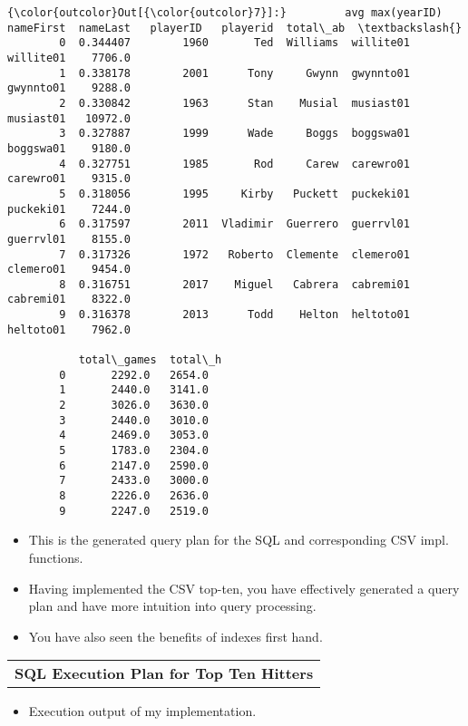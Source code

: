 \documentclass[11pt]{article}
\providecommand{\tightlist}{%
      \setlength{\itemsep}{0pt}\setlength{\parskip}{0pt}}
\begin{document}
\begin{Verbatim}[commandchars=\\\{\}]
{\color{outcolor}Out[{\color{outcolor}7}]:}         avg max(yearID) nameFirst  nameLast   playerID   playerid  total\_ab  \textbackslash{}
        0  0.344407        1960       Ted  Williams  willite01  willite01    7706.0   
        1  0.338178        2001      Tony     Gwynn  gwynnto01  gwynnto01    9288.0   
        2  0.330842        1963      Stan    Musial  musiast01  musiast01   10972.0   
        3  0.327887        1999      Wade     Boggs  boggswa01  boggswa01    9180.0   
        4  0.327751        1985       Rod     Carew  carewro01  carewro01    9315.0   
        5  0.318056        1995     Kirby   Puckett  puckeki01  puckeki01    7244.0   
        6  0.317597        2011  Vladimir  Guerrero  guerrvl01  guerrvl01    8155.0   
        7  0.317326        1972   Roberto  Clemente  clemero01  clemero01    9454.0   
        8  0.316751        2017    Miguel   Cabrera  cabremi01  cabremi01    8322.0   
        9  0.316378        2013      Todd    Helton  heltoto01  heltoto01    7962.0   
        
           total\_games  total\_h  
        0       2292.0   2654.0  
        1       2440.0   3141.0  
        2       3026.0   3630.0  
        3       2440.0   3010.0  
        4       2469.0   3053.0  
        5       1783.0   2304.0  
        6       2147.0   2590.0  
        7       2433.0   3000.0  
        8       2226.0   2636.0  
        9       2247.0   2519.0  
\end{Verbatim}
            
    \begin{itemize}
\item
  This is the generated query plan for the SQL and corresponding CSV
  impl. functions.
\item
  Having implemented the CSV top-ten, you have effectively generated a
  query plan and have more intuition into query processing.
\item
  You have also seen the benefits of indexes first hand.
\end{itemize}

\begin{longtable}[]{@{}c@{}}
\toprule
\tabularnewline
\midrule
\endhead
\textbf{SQL Execution Plan for Top Ten Hitters}\tabularnewline
\bottomrule
\end{longtable}

    \begin{itemize}
\tightlist
\item
  Execution output of my implementation.
\end{itemize}
\end{document}
